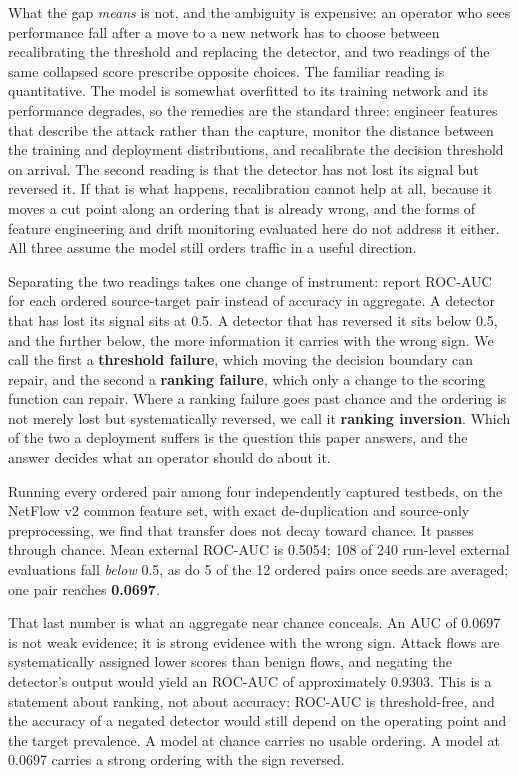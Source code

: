 \documentclass[11pt,a4paper]{article}
\begin{document}
What the gap \emph{means} is not, and the ambiguity is expensive: an operator who sees performance fall after a move to a new network has to choose between recalibrating the threshold and replacing the detector, and two readings of the same collapsed score prescribe opposite choices. The familiar reading is quantitative. The model is somewhat overfitted to its training network and its performance degrades, so the remedies are the standard three: engineer features that describe the attack rather than the capture, monitor the distance between the training and deployment distributions, and recalibrate the decision threshold on arrival. The second reading is that the detector has not lost its signal but reversed it. If that is what happens, recalibration cannot help at all, because it moves a cut point along an ordering that is already wrong, and the forms of feature engineering and drift monitoring evaluated here do not address it either. All three assume the model still orders traffic in a useful direction.

Separating the two readings takes one change of instrument: report ROC-AUC for each ordered source-target pair instead of accuracy in aggregate. A detector that has lost its signal sits at 0.5. A detector that has reversed it sits below 0.5, and the further below, the more information it carries with the wrong sign. We call the first a \textbf{threshold failure}, which moving the decision boundary can repair, and the second a \textbf{ranking failure}, which only a change to the scoring function can repair. Where a ranking failure goes past chance and the ordering is not merely lost but systematically reversed, we call it \textbf{ranking inversion}. Which of the two a deployment suffers is the question this paper answers, and the answer decides what an operator should do about it.

Running every ordered pair among four independently captured testbeds, on the NetFlow v2 common feature set, with exact de-duplication and source-only preprocessing, we find that transfer does not decay toward chance. It passes through chance. Mean external ROC-AUC is 0.5054; 108 of 240 run-level external evaluations fall \emph{below} 0.5, as do 5 of the 12 ordered pairs once seeds are averaged; one pair reaches \textbf{0.0697}.

That last number is what an aggregate near chance conceals. An AUC of 0.0697 is not weak evidence; it is strong evidence with the wrong sign. Attack flows are systematically assigned lower scores than benign flows, and negating the detector's output would yield an ROC-AUC of approximately 0.9303. This is a statement about ranking, not about accuracy: ROC-AUC is threshold-free, and the accuracy of a negated detector would still depend on the operating point and the target prevalence. A model at chance carries no usable ordering. A model at 0.0697 carries a strong ordering with the sign reversed.
\end{document}
